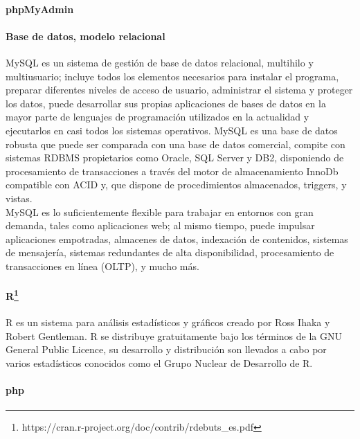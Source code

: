 \documentclass[11pt]{article}
\begin{document}
\hypertarget{phpmyadmin}{%
\paragraph{phpMyAdmin}\label{phpmyadmin}}

\hypertarget{base-de-datos-modelo-relacional}{%
\paragraph{Base de datos, modelo
relacional}\label{base-de-datos-modelo-relacional}}

MySQL es un sistema de gestión de base de datos relacional, multihilo y
multiusuario; incluye todos los elementos necesarios para instalar el
programa, preparar diferentes niveles de acceso de usuario, administrar
el sistema y proteger los datos, puede desarrollar sus propias
aplicaciones de bases de datos en la mayor parte de lenguajes de
programación utilizados en la actualidad y ejecutarlos en casi todos los
sistemas operativos. MySQL es una base de datos robusta que puede ser
comparada con una base de datos comercial, compite con sistemas RDBMS
propietarios como Oracle, SQL Server y DB2, disponiendo de procesamiento
de transacciones a través del motor de almacenamiento InnoDb compatible
con ACID y, que dispone de procedimientos almacenados, triggers, y
vistas.\\
MySQL es lo suficientemente flexible para trabajar en entornos con gran
demanda, tales como aplicaciones web; al mismo tiempo, puede impulsar
aplicaciones empotradas, almacenes de datos, indexación de contenidos,
sistemas de mensajería, sistemas redundantes de alta disponibilidad,
procesamiento de transacciones en línea (OLTP), y mucho más.

\hypertarget{r12}{%
\paragraph[R]{\texorpdfstring{R\footnote{https://cran.r-project.org/doc/contrib/rdebuts\_es.pdf}}{R}}\label{r12}}

R es un sistema para análisis estadísticos y gráficos creado por Ross
Ihaka y Robert Gentleman. R se distribuye gratuitamente bajo los
términos de la GNU General Public Licence, su desarrollo y distribución
son llevados a cabo por varios estadísticos conocidos como el Grupo
Nuclear de Desarrollo de R.

\hypertarget{php}{%
\paragraph{php}\label{php}}
\end{document}
